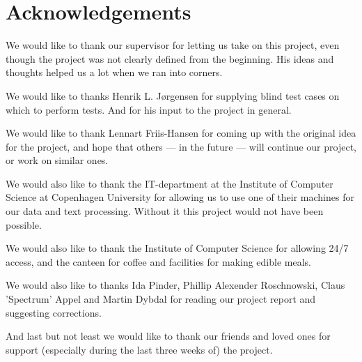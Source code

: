 \chapter*{Acknowledgements}
We would like to thank our supervisor for letting us take on this
project, even though the project was not clearly defined from the
beginning. His ideas and thoughts helped us a lot when we ran into
corners.

We would like to thanks Henrik L. J\o rgensen for supplying blind test
cases on which to perform tests. And for his input to the project in
general.

We would like to thank Lennart Friis-Hansen for coming up with the
original idea for the project, and hope that others --- in the future
--- will continue our project, or work on similar ones.

We would also like to thank the IT-department at the Institute of
Computer Science at Copenhagen University for allowing us to use one
of their machines for our data and text processing. Without it this project
would not have been possible.

We would also like to thank the Institute of Computer Science for
allowing 24/7 access, and the canteen for coffee and facilities for
making edible meals.

We would also like to thanks Ida Pinder, Phillip Alexender Roschnowski,
Claus 'Spectrum' Appel and Martin Dybdal for reading our project
report and suggesting corrections.

And last but not least we would like to thank our friends and loved
ones for support (especially during the last three weeks of) the
project.
